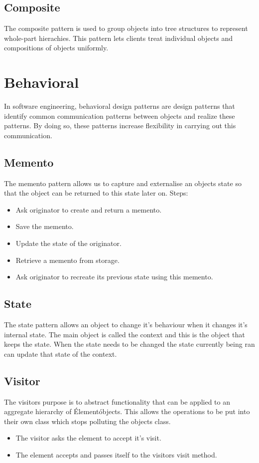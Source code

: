 \subsection{Composite}
The composite pattern is used to group objects into tree structures to represent whole-part hierachies. This pattern lets clients treat individual objects and compositions of objects uniformly. \cite{sourcemaking}

\section{Behavioral}
In software engineering, behavioral design patterns are design patterns that identify common communication patterns between objects and realize these patterns. By doing so, these patterns increase flexibility in carrying out this communication. \cite{sourcemaking}

\subsection{Memento}
The memento pattern allows us to capture and externalise an objects state so that the object can be returned to this state later on.
Steps:
\begin{itemize}
	\item Ask originator to create and return a memento.
	\item Save the memento.
	\item Update the state of the originator.
	\item Retrieve a memento from storage.
	\item Ask originator to recreate its previous state using this memento.
\end{itemize}

\subsection{State}
The state pattern allows an object to change it's behaviour when it changes it's internal state. The main object is called the context and this is the object that keeps the state. When the state needs to be changed the state currently being ran can update that state of the context.

\subsection{Visitor}
The visitors purpose is to abstract functionality that can be applied to an aggregate hierarchy of \'Element\' objects. \cite{sourcemaking} This allows the operations to be put into their own class which stops polluting the objects class.
\begin{itemize}
	\item The visitor asks the element to accept it's visit.
	\item The element accepts and passes itself to the visitors visit method.
\end{itemize}
